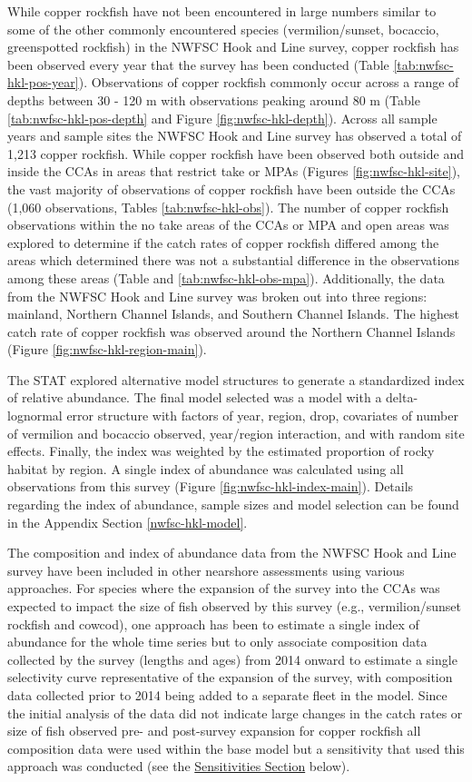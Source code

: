 \documentclass[11pt,
  english,
  letterpaper,
]{article}
\begin{document}
While copper rockfish have not been encountered in large numbers similar to some of the other commonly encountered species (vermilion/sunset, bocaccio, greenspotted rockfish) in the NWFSC Hook and Line survey, copper rockfish has been observed every year that the survey has been conducted (Table \ref{tab:nwfsc-hkl-pos-year}). Observations of copper rockfish commonly occur across a range of depths between 30 - 120 m with observations peaking around 80 m (Table \ref{tab:nwfsc-hkl-pos-depth} and Figure \ref{fig:nwfsc-hkl-depth}). Across all sample years and sample sites the NWFSC Hook and Line survey has observed a total of 1,213 copper rockfish. While copper rockfish have been observed both outside and inside the CCAs in areas that restrict take or MPAs (Figures \ref{fig:nwfsc-hkl-site}), the vast majority of observations of copper rockfish have been outside the CCAs (1,060 observations, Tables \ref{tab:nwfsc-hkl-obs}). The number of copper rockfish observations within the no take areas of the CCAs or MPA and open areas was explored to determine if the catch rates of copper rockfish differed among the areas which determined there was not a substantial difference in the observations among these areas (Table and \ref{tab:nwfsc-hkl-obs-mpa}). Additionally, the data from the NWFSC Hook and Line survey was broken out into three regions: mainland, Northern Channel Islands, and Southern Channel Islands. The highest catch rate of copper rockfish was observed around the Northern Channel Islands (Figure \ref{fig:nwfsc-hkl-region-main}).

The STAT explored alternative model structures to generate a standardized index of relative abundance. The final model selected was a model with a delta-lognormal error structure with factors of year, region, drop, covariates of number of vermilion and bocaccio observed, year/region interaction, and with random site effects. Finally, the index was weighted by the estimated proportion of rocky habitat by region. A single index of abundance was calculated using all observations from this survey (Figure \ref{fig:nwfsc-hkl-index-main}). Details regarding the index of abundance, sample sizes and model selection can be found in the Appendix Section \ref{nwfsc-hkl-model}.

The composition and index of abundance data from the NWFSC Hook and Line survey have been included in other nearshore assessments using various approaches. For species where the expansion of the survey into the CCAs was expected to impact the size of fish observed by this survey (e.g., vermilion/sunset rockfish and cowcod), one approach has been to estimate a single index of abundance for the whole time series but to only associate composition data collected by the survey (lengths and ages) from 2014 onward to estimate a single selectivity curve representative of the expansion of the survey, with composition data collected prior to 2014 being added to a separate fleet in the model. Since the initial analysis of the data did not indicate large changes in the catch rates or size of fish observed pre- and post-survey expansion for copper rockfish all composition data were used within the base model but a sensitivity that used this approach was conducted (see the \protect\hyperlink{sensitivities}{Sensitivities Section} below).
\end{document}
